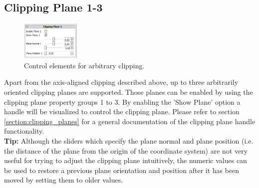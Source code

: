 \subsection{Clipping Plane 1-3}\label{ultramicroscopy.section.clipping}
\begin{minipage}{\textwidth}
\begin{figure}
\vspace*{-1cm}
\centering
\includegraphics[width=0.25\textwidth]{images/clipping_plane.png}
\caption{Control elements for arbitrary clipping.}
\label{ultramicroscopy.figure.clipping}
\end{figure}
Apart from the axis-aligned clipping described above, up to three arbitrarily oriented clipping planes are supported. 
Those planes can be enabled by using the clipping plane property groups 1 to 3. 
By enabling the 'Show Plane' option a handle will be visualized to control the clipping plane. 
Please refer to section \ref{section:clipping_planes} for a general documentation of the clipping plane handle functionality.\\
\textbf{Tip: } Although the sliders which specify the plane normal and plane position (i.e. the distance of the plane from the origin
of the coordinate system) are not very useful for trying to adjust the clipping plane intuitively, the 
numeric values can be used to restore a previous plane orientation and position after it has been moved by setting them to older values. 
\end{minipage}

